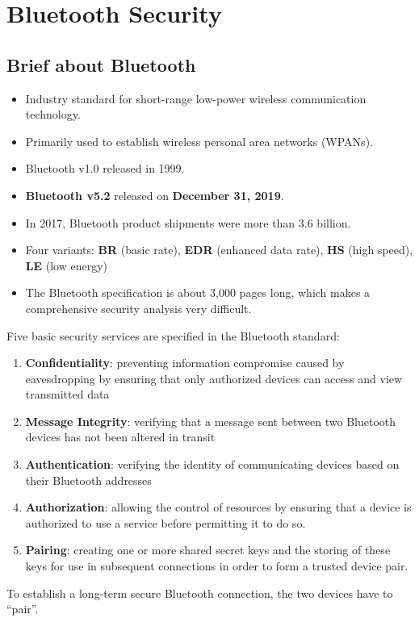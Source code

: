 \documentclass[12pt,titlepage]{article}
\let\stdsection\section
\renewcommand\section{\clearpage\stdsection}
\begin{document}
\section{Bluetooth Security}
\subsection{Brief about Bluetooth}
\begin{itemize}
	\item Industry standard for short-range low-power wireless communication technology.
	\item Primarily used to establish wireless personal area networks (WPANs).
	\item Bluetooth v1.0 released in 1999.
	\item \textbf{Bluetooth v5.2} released on \textbf{December 31, 2019}.
	\item In 2017, Bluetooth product shipments were more than 3.6 billion.
	\item Four variants: \textbf{BR} (basic rate), \textbf{EDR} (enhanced data rate), \textbf{HS} (high speed), \textbf{LE} (low energy)
	\item The Bluetooth specification is about 3,000 pages long, which makes a comprehensive security analysis very difficult.
\end{itemize}

Five basic security services are specified in the Bluetooth standard:\begin{enumerate}
	\item \textbf{Confidentiality}: preventing information compromise caused by eavesdropping by ensuring that only authorized devices can access and view transmitted data
	\item \textbf{Message Integrity}: verifying that a message sent between two Bluetooth devices has not been altered in transit
	\item \textbf{Authentication}: verifying the identity of communicating devices based on their Bluetooth addresses
	\item \textbf{Authorization}: allowing the control of resources by ensuring that a device is authorized to use a service before permitting it to do so.
	\item \textbf{Pairing}: creating one or more shared secret keys and the storing of these keys for use in subsequent connections in order to form a trusted device pair.
\end{enumerate}

To establish a long-term secure Bluetooth connection, the two devices have to ``pair''. 
\end{document}
